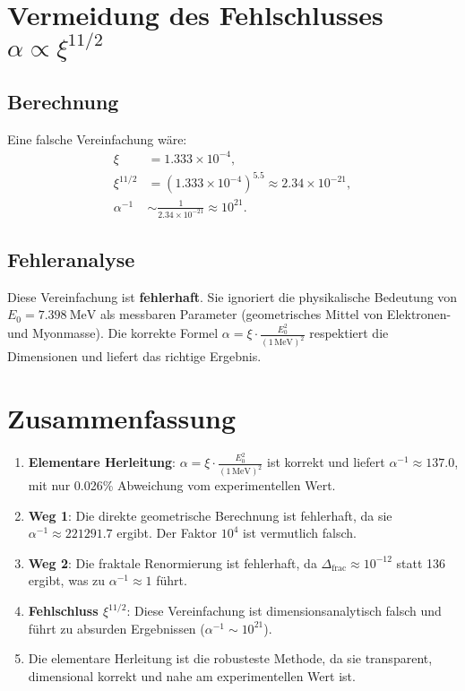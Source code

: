 \documentclass[12pt,a4paper]{article}
\theoremstyle{definition}
\begin{document}
	\section{Vermeidung des Fehlschlusses \(\alpha \propto \xi^{11/2}\)}
	\subsection{Berechnung}
	Eine falsche Vereinfachung wäre:
	\begin{align}
		\xi &= 1.333 \times 10^{-4}, \\
		\xi^{11/2} &= (1.333 \times 10^{-4})^{5.5} \approx 2.34 \times 10^{-21}, \\
		\alpha^{-1} &\sim \frac{1}{2.34 \times 10^{-21}} \approx 10^{21}.
	\end{align}
	
	\subsection{Fehleranalyse}
	\begin{tcolorbox}[colback=red!5!white,colframe=deepred,title=Fehler]
		Diese Vereinfachung ist \textbf{fehlerhaft}. Sie ignoriert die physikalische Bedeutung von \(E_0 = \SI{7.398}{\MeV}\) als messbaren Parameter (geometrisches Mittel von Elektronen- und Myonmasse). Die korrekte Formel \(\alpha = \xi \cdot \frac{E_0^2}{(1 \, \text{MeV})^2}\) respektiert die Dimensionen und liefert das richtige Ergebnis.
	\end{tcolorbox}
	
	\section{Zusammenfassung}
	\begin{tcolorbox}[colback=deepblue!5!white,colframe=deepblue,title=Zusammenfassung]
		\begin{enumerate}
			\item \textbf{Elementare Herleitung}: \(\alpha = \xi \cdot \frac{E_0^2}{(1 \, \text{MeV})^2}\) ist korrekt und liefert \(\alpha^{-1} \approx 137.0\), mit nur 0.026\% Abweichung vom experimentellen Wert.
			\item \textbf{Weg 1}: Die direkte geometrische Berechnung ist fehlerhaft, da sie \(\alpha^{-1} \approx 221291.7\) ergibt. Der Faktor \(10^4\) ist vermutlich falsch.
			\item \textbf{Weg 2}: Die fraktale Renormierung ist fehlerhaft, da \(\Delta_{\text{frac}} \approx 10^{-12}\) statt 136 ergibt, was zu \(\alpha^{-1} \approx 1\) führt.
			\item \textbf{Fehlschluss \(\xi^{11/2}\)}: Diese Vereinfachung ist dimensionsanalytisch falsch und führt zu absurden Ergebnissen (\(\alpha^{-1} \sim 10^{21}\)).
			\item Die elementare Herleitung ist die robusteste Methode, da sie transparent, dimensional korrekt und nahe am experimentellen Wert ist.
		\end{enumerate}
	\end{tcolorbox}
	
\end{document}
